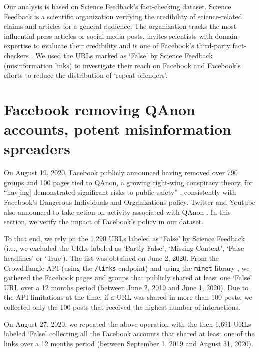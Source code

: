 \documentclass[sigconf]{acmart}
\begin{document}
Our analysis is based on Science Feedback's fact-checking dataset. Science Feedback is a scientific organization verifying the credibility of science-related claims and articles for a general audience. The organization tracks the most influential press articles or social media posts, invites scientists with domain expertise to evaluate their credibility and is one of  Facebook's third-party fact-checkers \cite{ScienceFeedbackCommunication}. We used the URLs marked as `False' by Science Feedback (misinformation links) to investigate their reach on Facebook and Facebook's efforts to reduce the distribution of `repeat offenders'.

\section{Facebook removing QAnon accounts, potent misinformation spreaders}

On August 19, 2020, Facebook publicly announced having removed over 790 groups and 100 pages tied to QAnon, a growing right-wing conspiracy theory, for ``hav[ing] demonstrated significant risks to public safety'' \cite{FacebookQAnon}, consistently with Facebook's Dangerous Individuals and Organizations policy. Twitter and Youtube also announced to take action on activity associated with QAnon \cite{TwitterQAnon, YoutubeQAnon}. In this section, we verify the impact of Facebook's policy in our dataset.

To that end, we rely on the 1,290 URLs labeled as `False' by Science Feedback (i.e., we excluded the URLs labeled as `Partly False', `Missing Context', `False headlines' or `True'). The list was obtained on June 2, 2020. From the CrowdTangle API (using the \verb|/links| endpoint) and using the \verb|minet| library \cite{minet}, we gathered the Facebook pages and groups that publicly shared at least one `False' URL over a 12 months period (between June 2, 2019 and June 1, 2020). Due to the API limitations at the time, if a URL was shared in more than 100 posts, we collected only the 100 posts that received the highest number of interactions.

On August 27, 2020, we repeated the above operation with the then 1,691 URLs labeled `False' collecting all the Facebook accounts that shared at least one of the links over a 12 months period (between September 1, 2019 and August 31, 2020).
\end{document}
